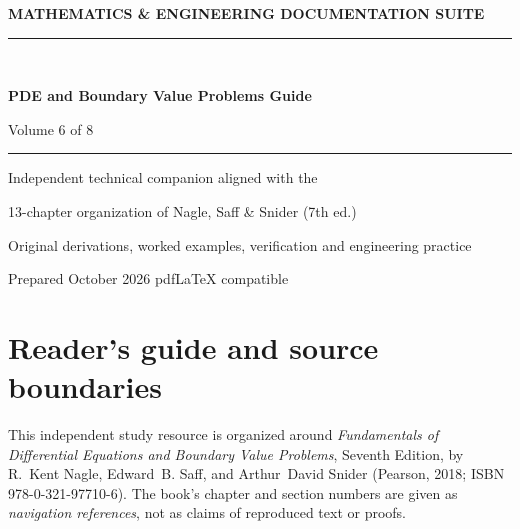 \documentclass[11pt,letterpaper,oneside]{report}
\theoremstyle{definition}\newtheorem{definition}[theorem]{Definition}
\theoremstyle{remark}\newtheorem{remark}[theorem]{Remark}
\begin{document}
\hypersetup{pageanchor=false}%
\begin{titlepage}
\pagecolor{navy}\color{white}
\vspace*{0.75in}
{\sffamily\bfseries\large MATHEMATICS \& ENGINEERING DOCUMENTATION SUITE\\[12pt]}
{\color{cyan!40}\rule{\textwidth}{2pt}}\\[1.0in]
{\sffamily\bfseries\fontsize{29}{36}\selectfont PDE and Boundary Value Problems Guide\par}
\vspace{0.45in}
{\Large Volume 6 of 8}\par\vspace{0.55in}
{\color{cyan!30}\rule{0.50\textwidth}{1pt}}\par\vspace{0.3in}
{\large Independent technical companion aligned with the\par}
{\large 13-chapter organization of Nagle, Saff \& Snider (7th ed.)\par}
\vfill
{\large Original derivations, worked examples, verification and engineering practice\par}\vspace{0.3in}
{\small Prepared October 2026 \quad\textbullet\quad pdf\LaTeX{} compatible\par}
\end{titlepage}\hypersetup{pageanchor=true}
\nopagecolor\color{ink}
\chapter*{Reader's guide and source boundaries}
This independent study resource is organized around \emph{Fundamentals of Differential Equations and Boundary Value Problems}, Seventh Edition, by R.~Kent Nagle, Edward~B. Saff, and Arthur~David Snider (Pearson, 2018; ISBN 978-0-321-97710-6). The book's chapter and section numbers are given as \emph{navigation references}, not as claims of reproduced text or proofs.
\end{document}
